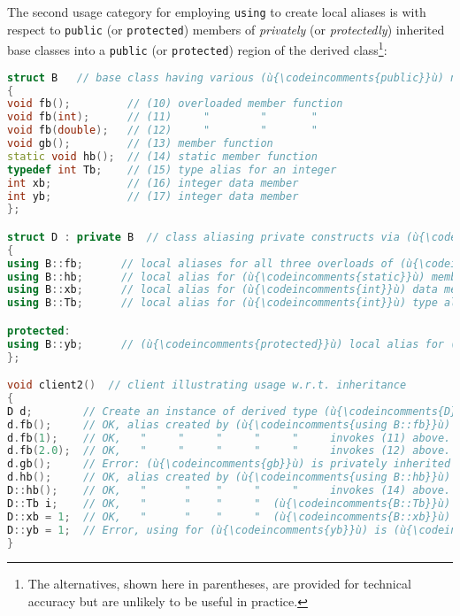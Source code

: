 \noindent The second usage category for employing \texttt{using} to create local
aliases is with respect to \texttt{public} (or \texttt{protected})
members of \emph{privately} (or \emph{protectedly}) inherited base
classes into a \texttt{public} (or \texttt{protected}) region of the
derived class{\cprotect\footnote{The alternatives, shown here in
parentheses, are provided for technical accuracy but are unlikely to
be useful in practice.}}:

\begin{lstlisting}[language=C++]
struct B   // base class having various (ù{\codeincomments{public}}ù) named entities
{
void fb();         // (10) overloaded member function
void fb(int);      // (11)     "        "       "
void fb(double);   // (12)     "        "       "
void gb();         // (13) member function
static void hb();  // (14) static member function
typedef int Tb;    // (15) type alias for an integer
int xb;            // (16) integer data member
int yb;            // (17) integer data member
};

struct D : private B  // class aliasing private constructs via (ù{\codeincomments{using}}ù)
{
using B::fb;      // local aliases for all three overloads of (ù{\codeincomments{fb}}ù)
using B::hb;      // local alias for (ù{\codeincomments{static}}ù) member function (ù{\codeincomments{hb}}ù)
using B::xb;      // local alias for (ù{\codeincomments{int}}ù) data member (ù{\codeincomments{xb}}ù)
using B::Tb;      // local alias for (ù{\codeincomments{int}}ù) type alias

protected:
using B::yb;      // (ù{\codeincomments{protected}}ù) local alias for (ù{\codeincomments{int}}ù) data member (ù{\codeincomments{yb}}ù)
};

void client2()  // client illustrating usage w.r.t. inheritance
{
D d;        // Create an instance of derived type (ù{\codeincomments{D}}ù).
d.fb();     // OK, alias created by (ù{\codeincomments{using B::fb}}ù)  invokes (10) above.
d.fb(1);    // OK,   "     "     "     "     "     invokes (11) above.
d.fb(2.0);  // OK,   "     "     "     "     "     invokes (12) above.
d.gb();     // Error: (ù{\codeincomments{gb}}ù) is privately inherited without using declaration.
d.hb();     // OK, alias created by (ù{\codeincomments{using B::hb}}ù)  invokes (14) above.
D::hb();    // OK,   "      "    "     "     "     invokes (14) above.
D::Tb i;    // OK,   "      "    "     "  (ù{\codeincomments{B::Tb}}ù)  aliases (15) above.
D::xb = 1;  // OK,   "      "    "     "  (ù{\codeincomments{B::xb}}ù)  assigns (16) above.
D::yb = 1;  // Error, using for (ù{\codeincomments{yb}}ù) is (ù{\codeincomments{protected}}ù), not (ù{\codeincomments{public}}ù).
}
\end{lstlisting}

